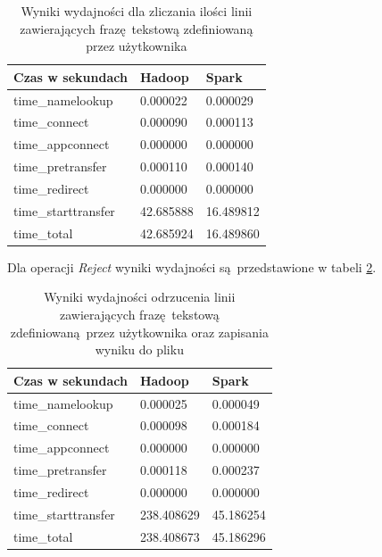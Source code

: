 \begin{table}[]
	\centering
	\caption{Wyniki wydajności dla zliczania ilości linii zawierających frazę tekstową zdefiniowaną przez użytkownika}
	\label{tab:filter-results}
	\begin{tabular}{|l|l|l|}
		\hline
		Czas w sekundach    & Hadoop    & Spark     \\ \hline
		time\_namelookup    & 0.000022  & 0.000029  \\ \hline
		time\_connect       & 0.000090  & 0.000113  \\ \hline
		time\_appconnect    & 0.000000  & 0.000000  \\ \hline
		time\_pretransfer   & 0.000110  & 0.000140  \\ \hline
		time\_redirect      & 0.000000  & 0.000000  \\ \hline
		time\_starttransfer & 42.685888 & 16.489812 \\ \hline
		time\_total         & 42.685924 & 16.489860 \\ \hline
	\end{tabular}
\end{table}
Dla operacji \textit{Reject} wyniki wydajności są przedstawione w tabeli \ref{tab:reject-results}.
\begin{table}[]
	\centering
	\caption{Wyniki wydajności odrzucenia linii zawierających frazę tekstową zdefiniowaną przez użytkownika oraz zapisania wyniku do pliku}
	\label{tab:reject-results}
	\begin{tabular}{|l|l|l|}
		\hline
		Czas w sekundach    & Hadoop     & Spark     \\ \hline
		time\_namelookup    & 0.000025   & 0.000049  \\ \hline
		time\_connect       & 0.000098   & 0.000184  \\ \hline
		time\_appconnect    & 0.000000   & 0.000000  \\ \hline
		time\_pretransfer   & 0.000118   & 0.000237  \\ \hline
		time\_redirect      & 0.000000   & 0.000000  \\ \hline
		time\_starttransfer & 238.408629 & 45.186254 \\ \hline
		time\_total         & 238.408673 & 45.186296 \\ \hline
	\end{tabular}
\end{table}
